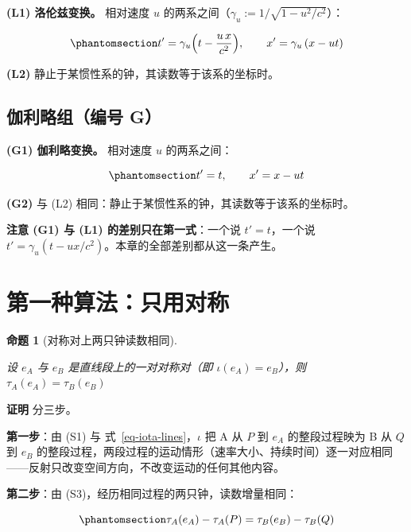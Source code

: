 \documentclass[
  chinese,
  a4paper,
  UTF8,
  12pt,
  oneside,
  openany]{ctexbook}
\theoremstyle{plain}
\theoremstyle{plain}
\theoremstyle{plain}
\newtheorem{proposition}{命题}[chapter]
\theoremstyle{definition}
\theoremstyle{plain}
\theoremstyle{plain}
\theoremstyle{remark}
\begin{document}
\textbf{(L1) 洛伦兹变换。} 相对速度 \(u\)
的两系之间（\(\gamma_u:=1/\sqrt{1-u^{2}/c^{2}}\)）：

\begin{equation}\protect\phantomsection\label{eq-L1}{
t'=\gamma_u\Bigl(t-\frac{u\,x}{c^{2}}\Bigr),\qquad x'=\gamma_u\,(x-ut)
}\end{equation}

\textbf{(L2)} 静止于某惯性系的钟，其读数等于该系的坐标时。

\subsection{伽利略组（编号
G）}\label{ux4f3dux5229ux7565ux7ec4ux7f16ux53f7-g}

\textbf{(G1) 伽利略变换。} 相对速度 \(u\) 的两系之间：

\begin{equation}\protect\phantomsection\label{eq-G1}{
t'=t,\qquad x'=x-ut
}\end{equation}

\textbf{(G2)} 与 (L2) 相同：静止于某惯性系的钟，其读数等于该系的坐标时。

\textbf{注意 (G1) 与 (L1) 的差别只在第一式}：一个说 \(t'=t\)，一个说
\(t'=\gamma_u(t-ux/c^{2})\)。本章的全部差别都从这一条产生。

\section{第一种算法：只用对称}\label{sec-tc-symmetry}

\begin{proposition}[对称对上两只钟读数相同]\protect\hypertarget{prp-tc-equal}{}\label{prp-tc-equal}

设 \(e_A\) 与 \(e_B\) 是直线段上的一对对称对（即
\(\iota(e_A)=e_B\)），则 \(\tau_A(e_A)=\tau_B(e_B)\)

\end{proposition}

\textbf{证明} 分三步。

\textbf{第一步}：由 (S1) 与 式~\ref{eq-iota-lines}，\(\iota\) 把 A 从
\(P\) 到 \(e_A\) 的整段过程映为 B 从 \(Q\) 到 \(e_B\)
的整段过程，两段过程的运动情形（速率大小、持续时间）逐一对应相同------反射只改变空间方向，不改变运动的任何其他内容。

\textbf{第二步}：由 (S3)，经历相同过程的两只钟，读数增量相同：

\begin{equation}\protect\phantomsection\label{eq-tc-inc}{
\tau_A(e_A)-\tau_A(P)=\tau_B(e_B)-\tau_B(Q)
}\end{equation}
\end{document}
